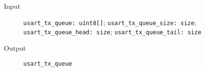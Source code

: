 \begin{flushleft}
  \begin{description}
    \item [Input]
      \verb#usart_tx_queue: uint8[]#;
      \verb#usart_tx_queue_size: size#;
      \verb#usart_tx_queue_head: size#;
      \verb#usart_tx_queue_tail: size#
    \item [Output]
      \verb#usart_tx_queue#
  \end{description}
\end{flushleft}
